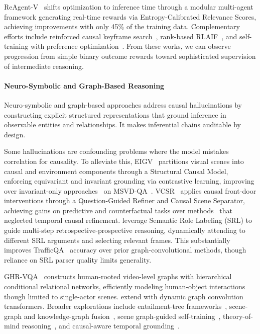 \documentclass[10pt]{article} %
\begin{document}
ReAgent-V~\citep{Zhou2025ReAgentVAR} shifts optimization to inference time through a modular multi-agent framework generating real-time rewards via Entropy-Calibrated Relevance Scores, achieving improvements with only 45\% of the training data. Complementary efforts include reinforced causal keyframe search~\citep{Zhou2025ReaSonRC}, rank-based RLAIF~\citep{Shi2025OracleRLAIFAI}, and self-training with preference optimization~\citep{Zohar2024VideoSTaRSE}.
From these works, we can observe progression from simple binary outcome rewards toward sophisticated supervision of intermediate reasoning. %

\paragraph{Neuro-Symbolic and Graph-Based Reasoning}

Neuro-symbolic and graph-based approaches address causal hallucinations by constructing explicit structured representations that ground inference in observable entities and relationships. It makes inferential chains auditable by design.

Some hallucinations are confounding problems where the model mistakes correlation for causality. To alleviate this, EIGV~\citep{Li2022EquivariantAI} partitions visual scenes into causal and environment components through a Structural Causal Model, enforcing equivariant and invariant grounding via contrastive learning, improving over invariant-only approaches~\citep{Li2022InvariantGF} on MSVD-QA~\citep{Xu2017VideoQA}.  VCSR~\citep{Wei2023VisualCS} applies causal front-door interventions through a Question-Guided Refiner and Causal Scene Separator, achieving gains on predictive and counterfactual tasks over methods~\citep{Liu2022CrossModalCR} that neglected temporal causal refinement.
\citet{Lyu2023SemanticAwareDR} leverage Semantic Role Labeling (SRL) to guide multi-step retrospective-prospective reasoning, dynamically attending to different SRL arguments and selecting relevant frames. This substantially improves TrafficQA~\citep{xu2021sutd} accuracy over prior graph-convolutional methods, though reliance on SRL parser quality limits generality.

GHR-VQA~\citep{Brilli2025GHRVQAGH} constructs human-rooted video-level graphs with hierarchical conditional relational networks, efficiently modeling human-object interactions though limited to single-actor scenes. \citet{Tang2024SpatioTemporalGC} extend with dynamic graph convolution transformers. Broader explorations include entailment-tree frameworks~\citep{Sanders2024TVTREESME}, scene-graph and knowledge-graph fusion~\citep{Taluzzi2025FromPT}, scene graph-guided self-training~\citep{Qiu2024STEPEV}, theory-of-mind reasoning~\citep{Chen2024ThroughTT}, and causal-aware temporal grounding~\citep{Dong2025LeAdQALC}.
\end{document}
